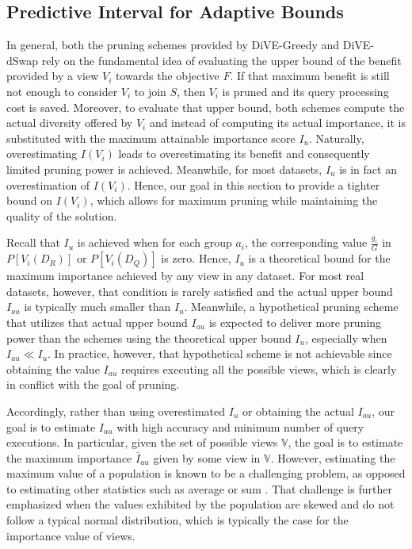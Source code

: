 
\vspace{-7pt}
\subsection{Predictive Interval for Adaptive Bounds}
\label{subsec:adaptive-pruning}


In general, both the pruning schemes provided by DiVE-Greedy and DiVE-dSwap rely on the fundamental idea of evaluating the upper bound of the benefit provided by a view $V_i$ towards the objective $F$. 
%
If that maximum benefit is still not enough to consider $V_i$ to join $S$, then $V_i$ is pruned and its query processing cost is saved. 
%
Moreover, to evaluate that upper bound, both schemes compute the actual diversity offered by $V_i$ and instead of computing its actual importance, it is substituted with the maximum attainable importance score $I_u$. 
%
Naturally, overestimating  $I(V_i)$ leads to overestimating its benefit and consequently limited pruning power is achieved. 
%
Meanwhile, for most datasets, $I_u$ is in fact an overestimation of $I(V_i)$. 
%
Hence, our goal in this section to provide a tighter bound on $I(V_i)$, which allows for maximum pruning while maintaining the quality of the solution. 
 

Recall that $I_u$ is achieved when for each group $a_i$, the corresponding value $\frac{g_i}{G}$ in $P[V_{i}(D_R)]$ or $P[V_{i}(D_Q)]$ is zero. 
%
Hence, $I_u$ is a theoretical bound for the maximum importance achieved by any view in any dataset.
%
For most real datasets, however, that condition is rarely satisfied and the actual upper bound $I_{au}$ is typically much smaller than $I_u$. 
%
Meanwhile, a hypothetical pruning scheme that utilizes that actual upper bound $I_{au}$ is expected to deliver more pruning power than the schemes using the theoretical upper bound $I_u$, especially when $I_{au}  \ll I_u$.
%
In practice, however, that hypothetical scheme is not achievable since obtaining the value $I_{au}$ requires executing all the possible views, which is clearly in conflict with the goal of pruning.

Accordingly, rather than using overestimated $I_u$ or obtaining the actual $I_{au}$, our goal is to estimate $I_{au}$ with high accuracy and minimum number of query executions. 
%
In particular, given the set of possible views $\mathbb{V}$, the goal is to estimate the maximum importance $\bar{I}_{au}$ given by some view in $\mathbb{V}$. 
%
However, estimating the maximum value of a population is known to be a challenging problem, as opposed to estimating other statistics such as average or sum \cite{Hu:2009:EAT:1516360.1516487}.
%
That challenge is further emphasized when the values exhibited by the population are skewed and do not follow a typical normal distribution, which is typically the case for the importance value of views.
 
